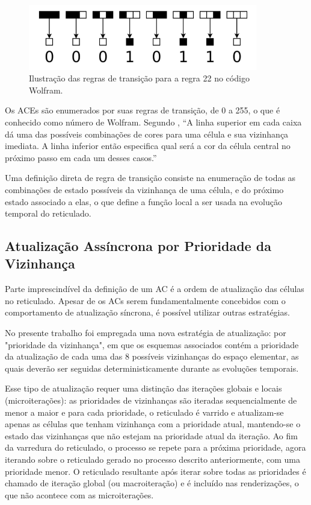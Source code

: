 \documentclass[a4paper,12pt]{ltxdoc}
\newcommand\tab[1][1cm]{\hspace*{#1}}
\begin{document}
\begin{figure}[!htbp]
  \centerline{\includegraphics[width=10cm]{imgs/rule_22.png}}
  \caption{Ilustração das regras de transição para a regra 22 no código Wolfram. }
\end{figure}

\tab Os ACEs são enumerados por suas regras de transição, de 0 a 255, o que é conhecido como número de Wolfram. Segundo \cite[p. 24]{wolfram2002new}, ``A linha superior em cada caixa dá uma das possíveis combinações de cores para uma célula e sua vizinhança imediata. A linha inferior então especifica qual será a cor da célula central no próximo passo em cada um desses casos.''

\tab Uma definição direta de regra de transição consiste na enumeração de todas as combinações de estado possíveis da vizinhança de uma célula, e do próximo estado associado a elas, o que define a função local a ser usada na evolução temporal do reticulado.


\subsection{Atualização Assíncrona por Prioridade da Vizinhança} \label{udsn}
Parte imprescindível da definição de um AC é a ordem de atualização das células no reticulado. Apesar de os ACs serem fundamentalmente concebidos com o comportamento de atualização síncrona, é possível utilizar outras estratégias.

\tab No presente trabalho foi empregada uma nova estratégia de atualização: por "prioridade da vizinhança", em que os esquemas associados contém a prioridade da atualização de cada uma das 8 possíveis vizinhanças do espaço elementar, as quais deverão ser seguidas deterministicamente durante as evoluções temporais.  

\tab Esse tipo de atualização requer uma distinção das iterações globais e locais (microiterações):  as prioridades de vizinhanças são iteradas sequencialmente de menor a maior e para cada prioridade, o reticulado é varrido e atualizam-se apenas as células que tenham vizinhança com a prioridade atual, mantendo-se o estado das vizinhanças que não estejam na prioridade atual da iteração. Ao fim da varredura do reticulado, o processo se repete para a próxima prioridade, agora iterando sobre o reticulado gerado no processo descrito anteriormente, com uma prioridade menor. O reticulado resultante após iterar sobre todas as prioridades é chamado de iteração global (ou macroiteração) e é incluído nas renderizações, o que não acontece com as microiterações.
\end{document}
